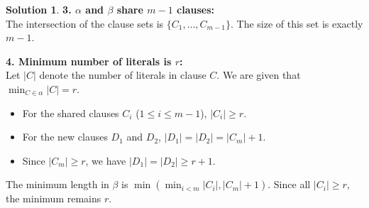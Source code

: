 \documentclass[12pt,a4paper]{article}
\theoremstyle{definition}
\newtheorem{solution}{Solution}
\begin{document}
\begin{solution}
\textbf{3. $\alpha$ and $\beta$ share $m-1$ clauses:} \\
The intersection of the clause sets is $\{C_1, \dots, C_{m-1}\}$. The size of this set is exactly $m-1$.

\textbf{4. Minimum number of literals is $r$:} \\
Let $|C|$ denote the number of literals in clause $C$. We are given that $\min_{C \in \alpha} |C| = r$.
\begin{itemize}
    \item For the shared clauses $C_i$ ($1 \le i \le m-1$), $|C_i| \ge r$.
    \item For the new clauses $D_1$ and $D_2$, $|D_1| = |D_2| = |C_m| + 1$.
    \item Since $|C_m| \ge r$, we have $|D_1| = |D_2| \ge r+1$.
\end{itemize}
The minimum length in $\beta$ is $\min( \min_{i<m} |C_i|, |C_m|+1 )$. Since all $|C_i| \ge r$, the minimum remains $r$.

\end{solution}
\end{document}
